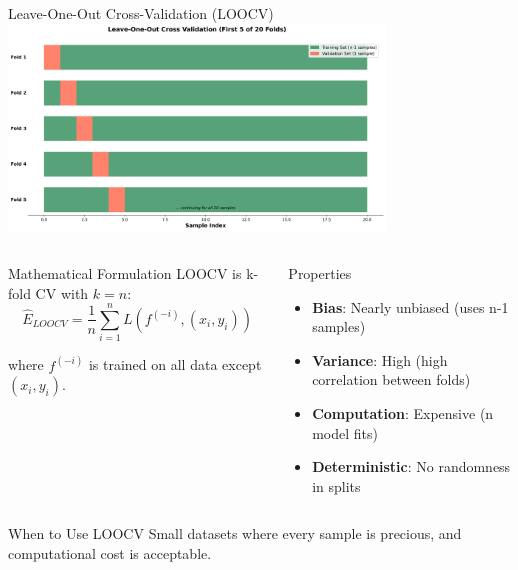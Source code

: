 \documentclass[8pt,aspectratio=1610]{beamer}
\begin{document}
\begin{frame}{Leave-One-Out Cross-Validation (LOOCV)}
\centering
\includegraphics[width=0.75\textwidth]{../figures/loocv_validation.png}

\vspace{0.3cm}

\begin{columns}[t]
\begin{column}{0.48\textwidth}
\begin{block}{Mathematical Formulation}
LOOCV is k-fold CV with $k = n$:
$$\hat{E}_{LOOCV} = \frac{1}{n}\sum_{i=1}^n L(f^{(-i)}, (x_i, y_i))$$

where $f^{(-i)}$ is trained on all data except $(x_i, y_i)$.
\end{block}
\end{column}

\begin{column}{0.48\textwidth}
\begin{block}{Properties}
\begin{itemize}
\setlength{\itemsep}{3pt}
\item \textbf{Bias}: Nearly unbiased (uses n-1 samples)
\item \textbf{Variance}: High (high correlation between folds)
\item \textbf{Computation}: Expensive (n model fits)
\item \textbf{Deterministic}: No randomness in splits
\end{itemize}
\end{block}
\end{column}
\end{columns}

\begin{alertblock}{When to Use LOOCV}
Small datasets where every sample is precious, and computational cost is acceptable.
\end{alertblock}
\end{frame}
\end{document}
